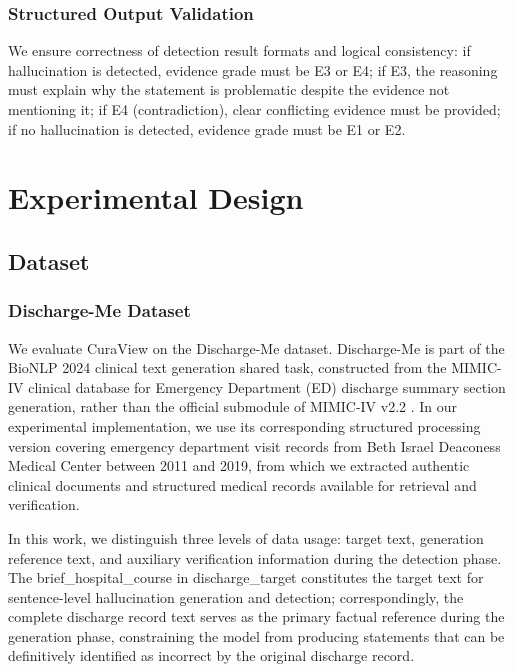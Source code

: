 \documentclass[11pt]{article}
\begin{document}
\subsubsection{Structured Output Validation}

We ensure correctness of detection result formats and logical consistency: if hallucination is detected, evidence grade must be E3 or E4; if E3, the reasoning must explain why the statement is problematic despite the evidence not mentioning it; if E4 (contradiction), clear conflicting evidence must be provided; if no hallucination is detected, evidence grade must be E1 or E2.

\section{Experimental Design}
\subsection{Dataset}

\subsubsection{Discharge-Me Dataset}

We evaluate CuraView on the Discharge-Me dataset. Discharge-Me is part of the BioNLP 2024 clinical text generation shared task, constructed from the MIMIC-IV clinical database for Emergency Department (ED) discharge summary section generation, rather than the official submodule of MIMIC-IV v2.2 \citep{stanfordaimi2024dischargeMe,xu2024dischargeMeSharedTask}. In our experimental implementation, we use its corresponding structured processing version covering emergency department visit records from Beth Israel Deaconess Medical Center between 2011 and 2019, from which we extracted authentic clinical documents and structured medical records available for retrieval and verification.

In this work, we distinguish three levels of data usage: target text, generation reference text, and auxiliary verification information during the detection phase. The brief\_hospital\_course in discharge\_target constitutes the target text for sentence-level hallucination generation and detection; correspondingly, the complete discharge record text serves as the primary factual reference during the generation phase, constraining the model from producing statements that can be definitively identified as incorrect by the original discharge record.
\end{document}
